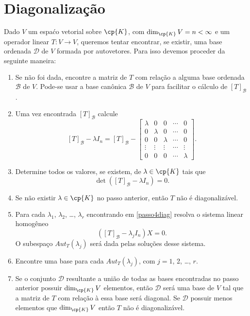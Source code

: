 \section{Diagonalização}
Dado $V$ um espaćo vetorial sobre $\cp{K}$, com $\dim_\cp{K} V = n < \infty$ e um operador linear $T \colon V \to V$, queremos tentar encontrar, se existir, uma base ordenada $\mathcal{D}$ de $V$ formada por autovetores. Para isso devemos proceder da seguinte maneira:
\begin{enumerate}
    \item Se não foi dada, encontre a matriz de $T$ com relação a alguma base ordenada $\mathcal{B}$ de $V$. Pode-se usar a base canônica $\mathcal{B}$ de $V$ para facilitar o cálculo de $[T]_\mathcal{B}$.

    \item Uma vez encontrada $[T]_\mathcal{B}$ calcule
        \[
            [T]_\mathcal{B} - \lambda I_n = [T]_\mathcal{B} - \begin{bmatrix}\lambda & 0 & 0 & \cdots & 0\\0 & \lambda & 0 & \cdots & 0\\0 & 0 & \lambda & \cdots & 0\\\vdots & \vdots & \vdots & \cdots & \vdots\\0 & 0 & 0 & \cdots & \lambda\end{bmatrix}.
        \]

    \item\label{passo4diag} Determine todos os valores, se existem, de $\lambda \in \cp{K}$ tais que
        \[
            \det([T]_\mathcal{B} - \lambda I_n) = 0.
        \]

    \item Se não existir $\lambda \in \cp{K}$ no passo anterior, então $T$ não é diagonalizável.

    \item Para cada $\lambda_1$, $\lambda_2$, \dots, $\lambda_r$ encontrando em \eqref{passo4diag} resolva o sistema linear homogêneo
        \[
            ([T]_\mathcal{B} - \lambda_jI_n)X = 0.
        \]
        O subespaço $Aut_T(\lambda_j)$ será dada pelas soluções desse sistema.

    \item Encontre uma base para cada $Aut_T(\lambda_j)$, com $j = 1$, 2, \dots, $r$.

    \item Se o conjunto $\mathcal{D}$ resultante a união de todas as bases encontradas no passo anterior possuir $\dim_\cp{K}V$ elementos, então $\mathcal{D}$ será uma base de $V$ tal que a matriz de $T$ com relação à essa base será diagonal. Se $\mathcal{D}$ possuir menos elementos que $\dim_\cp{K}V$ então $T$ não é diagonalizável.
\end{enumerate}

